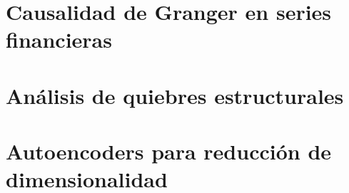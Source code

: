 \section{Causalidad de Granger en series financieras}

\section{Análisis de quiebres estructurales}

\section{Autoencoders para reducción de dimensionalidad}
